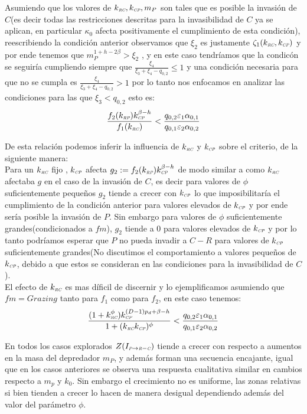 Asumiendo que los valores de $k_{\textit{\tiny RC}} , k_{\textit{\tiny CP}} , m_P$ son tales que es posible la invasi\'on de $C$(es decir todas las restricciones descritas para la invasibilidad de $C$ ya se aplican, en particular $\kappa_0$ afecta positivamente el cumplimiento de esta condici\'on), reescribiendo la condici\'on anterior observamos que $\xi_2$ es justamente $\zeta_1(k_{\textit{\tiny RC}},k_{\textit{\tiny CP}})$ y por ende tenemos que $m_P^{1 + h - 2\beta} > \xi_2$ , y en este caso tendr\'iamos que la condic\'on se seguir\'ia cumpliendo siempre que $\frac{\xi_4}{\xi_3 + \xi_4 - q_{0,2}} \leq 1$ y una condici\'on necesaria para que no se cumpla es $\frac{\xi_4}{\xi_3 + \xi_4 - q_{0,2}} > 1$ por lo tanto nos enfocamos en analizar las condiciones para las que $ \xi_3 < q_{0,2}$ esto es:
\begin{equation}
  \frac{f_2(k_{\textit{\tiny RP}}) k_{\textit{\tiny CP}}^{\beta - h}}{f_1(k_{\textit{\tiny RC}})} < \frac{q_{0,2} \varepsilon_1 \alpha_{0,1}}{q_{0,1} \varepsilon_2 \alpha_{0,2}}
\end{equation}

De esta relaci\'on podemos inferir la influencia de $k_{\textit{\tiny RC}}$ y $k_{\textit{\tiny CP}}$ sobre el criterio, de la siguiente manera:\\
Para un $k_{\textit{\tiny RC}}$ fijo , $k_{\textit{\tiny CP}}$ afecta $g_2 := f_2(k_{\textit{\tiny RP}}) k_{\textit{\tiny CP}}^{\beta -h}$  de modo similar a como $k_{\textit{\tiny RC}}$ afectaba $g$ en el caso de la invasi\'on de $C$, es decir para valores de $\phi$ suficientemente peque\~nos $g_2$ tiende a crecer con $k_{\textit{\tiny CP}}$ lo que imposibilitar\'ia el cumplimiento de la condici\'on anterior para valores elevados de $k_{\textit{\tiny CP}}$ y por ende ser\'ia posible la invasi\'on de $P$. Sin embargo para valores de $\phi$ suficientemente grandes(condicionados a $fm$), $g_2$ tiende a 0 para valores elevados de $k_{\textit{\tiny CP}}$ y por lo tanto podr\'iamos esperar que $P$ no pueda invadir a $C-R$ para valores de $k_{\textit{\tiny CP}}$ suficientemente grandes(No discutimos el comportamiento a valores peque\~nos de $k_{\textit{\tiny CP}}$, debido a que estos se consideran en las condiciones para la invasibilidad de $C$).\\
El efecto de $k_{\textit{\tiny RC}}$ es mas d\'ificil de discernir y lo ejemplificamos asumiendo que $fm = Grazing$ tanto para $f_1$ como para $f_2$, en este caso tenemos:
\begin{equation}
  \frac{(1 + k_{\textit{\tiny RC}}^\phi) k_{\textit{\tiny CP}}^{(D-1)p_d + \beta - h}}{1+(k_{\textit{\tiny RC}} k_{\textit{\tiny CP}})^\phi} <\frac{q_{0,2} \varepsilon_1 \alpha_{0,1}}{q_{0,1} \varepsilon_2 \alpha_{0,2}}
\end{equation}




En todos los casos explorados $Z(I_{\textit{\tiny P} \to \textit{\tiny R} - \textit{\tiny C}})$ tiende a crecer con respecto a aumentos en la masa del depredador $m_P$, y adem\'as forman una secuencia encajante, igual que en los casos anteriores se observa una respuesta cualitativa similar en cambios respecto a $m_p$ y $k_0$. Sin embargo el crecimiento no es uniforme, las zonas relativas si bien tienden a crecer lo hacen de manera desigual dependiendo adem\'as del valor del par\'ametro $\phi$.\\


